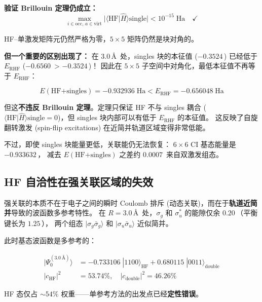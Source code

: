 \documentclass[fontset=mac]{ctexart}
\newcommand{\ket}[1]{|#1\rangle}
\newcommand{\braket}[2]{\langle #1|#2\rangle}
\begin{document}
\textbf{验证 Brillouin 定理仍成立：}
\begin{equation}
    \max_{i\in\text{occ},\,a\in\text{virt}} |\braket{\text{HF}}{\hat{H}}{\text{single}}|
    < 10^{-15}\;\text{Ha} \quad \checkmark
\end{equation}

HF--单激发矩阵元仍然严格为零，$5\times 5$ 矩阵仍然是块对角的。

\textbf{但一个重要的区别出现了：} 在 $3.0$\,\AA\, 处，singles 块的本征值 ($-0.3524$\,) 已经低于 $E_{\text{RHF}}$ ($-0.6560$\, > $-0.3524$\,)！
因此在 $5\times 5$ 子空间中对角化，最低本征值不再等于 $E_{\text{RHF}}$：

\begin{equation}
    E(\text{HF+singles}) = -0.932936\;\text{Ha} < E_{\text{RHF}} = -0.656048\;\text{Ha}
\end{equation}

但这\textbf{不违反 Brillouin 定理}。定理只保证 HF 不与 singles 耦合
($\braket{\text{HF}}{\hat{H}}{\text{single}}=0$)，但 singles 块内部可以有低于 $E_{\text{RHF}}$ 的本征值。
这反映了自旋翻转激发 (spin-flip excitations) 在近简并轨道区域变得非常低能。

不过，即使 singles 块能量更低，关联能仍无法恢复：
$6\times 6$ CI 基态能量是 $-0.933632$\,，
减去 $E(\text{HF+singles})$ 之差约 $0.0007$\,
来自双激发组态。

\subsection*{HF 自洽性在强关联区域的失效}

强关联的本质不在于电子之间的瞬时 Coulomb 排斥 (动态关联)，而在于\textbf{轨道近简并}导致的波函数多参考特性。
在 $R=3.0$\,\AA\, 处，$\sigma_g$ 和 $\sigma_u^*$ 的能隙仅余 $0.20$\,（平衡键长为 $1.25$\,），
两个组态 $\ket{\sigma_g\bar{\sigma}_g}$ 和 $\ket{\sigma_u\bar{\sigma}_u}$ 近似简并。

此时基态波函数是多参考的：

\begin{align}
    \ket{\Psi_0^{(3.0\,\text{\AA})}}
    &= -0.733106\;\ket{1100}_{\text{HF}} + 0.680115\;\ket{0011}_{\text{double}} \\
    |c_{\text{HF}}|^2 &= 53.74\%,\quad |c_{\text{double}}|^2 = 46.26\%
\end{align}

HF 态仅占 $\sim 54\%$ 权重——单参考方法的出发点已经\textbf{定性错误}。
\end{document}
